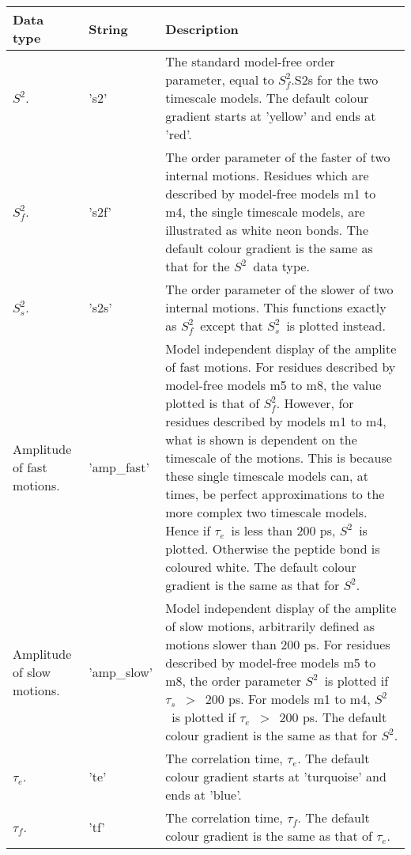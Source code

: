 \documentclass[a4paper,11pt,twoside,openright]{book}
\begin{document}
{\newpage\clearpage
{}%
\begin{table*}\begin{scriptsize}
\begin{center}

\begin{tabularx}{\textwidth}{llX}
\\[-5pt]
\toprule
Data type & String & Description \\
\midrule
$S^2$. & 's2' & The standard model-free order parameter, equal to $S^2_f$.S2s for the two timescale models.  The default colour gradient starts at 'yellow' and ends at 'red'. \\
$S^2_f$. & 's2f' & The order parameter of the faster of two internal motions.  Residues which are described by model-free models m1 to m4, the single timescale models, are illustrated as white neon bonds.  The default colour gradient is the same as that for the $S^2$\  data type. \\
$S^2_s$. & 's2s' & The order parameter of the slower of two internal motions.  This functions exactly as $S^2_f$\  except that $S^2_s$\  is plotted instead. \\
Amplitude of fast motions. & 'amp\_fast' & Model independent display of the amplite of fast motions.  For residues described by model-free models m5 to m8, the value plotted is that of $S^2_f$.  However, for residues described by models m1 to m4, what is shown is dependent on the timescale of the motions.  This is because these single timescale models can, at times, be perfect approximations to the more complex two timescale models.  Hence if $\tau_e$\  is less than 200 ps, $S^2$\  is plotted.  Otherwise the peptide bond is coloured white.  The default colour gradient  is the same as that for $S^2$. \\
Amplitude of slow motions. & 'amp\_slow' & Model independent display of the amplite of slow motions, arbitrarily defined as motions slower than 200 ps.  For residues described by model-free models m5 to m8, the order parameter $S^2$\  is plotted if $\tau_s$\  $>$\  200 ps.  For models m1 to m4, $S^2$\  is plotted if $\tau_e$\  $>$\  200 ps.  The default colour gradient is the same as that for $S^2$. \\
$\tau_e$. & 'te' & The correlation time, $\tau_e$.  The default colour gradient starts at 'turquoise' and ends at 'blue'. \\
$\tau_f$. & 'tf' & The correlation time, $\tau_f$.  The default colour gradient is the same as that of $\tau_e$. \\

\end{tabularx}
\end{center}
\end{scriptsize}
\end{table*}}
\end{document}
